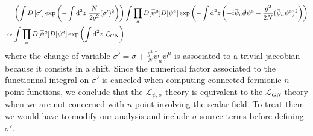 \documentclass[10pt, a4paper]{article}
\begin{document}
\begin{enumerate}
\begin{align*}
    &= \left(\int D\left[\sigma'\right] \exp\left(- \int \text{d}^2 z\ \frac{N}{2g^2}(\sigma')^2\right) \right)  \int \prod_{a} D[\bar{\psi}^a] D[\psi^a]  \exp\left(-\int \text{d}^2 z \left(-i\bar{\psi}_a\slashed{\partial}\psi^a-\frac{g^2}{2N} (\bar{\psi}_a \psi^a)^2  \right)\right)\\
    &\sim \int \prod_{a} D[\bar{\psi}^a] D[\psi^a]  \exp\left(\int \text{d}^2 z\ \mathcal{L}_{GN}\right)
  \end{align*} 
  where the change of variable $\sigma' = \sigma + \frac{g^2}{N} \bar{\psi}_a \psi^a$ is associated to a trivial jaccobian because it consists in a shift. Since the numerical factor associated to the functionnal integral on $\sigma'$ is canceled when computing connected fermionic $n$-point functions, we conclude that the $\mathcal{L}_{\psi, \sigma}$ theory is equivalent to the $\mathcal{L}_{GN}$ theory when we are not concerned with $n$-point involving the scalar field. To treat them we would have to modify our analysis and include $\sigma$ source terms before defining $\sigma'$. 


\end{enumerate}
\end{document}

